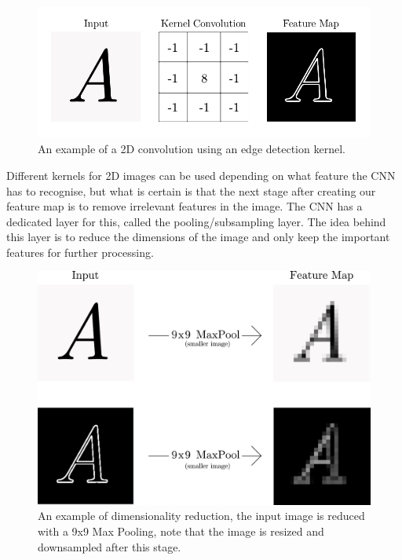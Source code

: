 \documentclass[report, 11pt, oneside]{dissertation}
\begin{document}
\begin{figure}[!htb]
	\centering
	\includegraphics[scale=1]{figure_9.pdf}
	\caption[An example of a 2D convolution.]{An example of a 2D convolution using an edge detection kernel.}
	\label{fig:2d_convolution}
\end{figure}

Different kernels for 2D images can be used depending on what feature the CNN has to recognise, but what is certain is that the next stage after creating our feature map is to remove irrelevant features in the image. The CNN has a dedicated layer for this, called the pooling/subsampling layer. The idea behind this layer is to reduce the dimensions of the image and only keep the important features for further processing. 

\begin{figure}[!htb]
	\centering
	\includegraphics[scale=0.65]{figure_10.pdf}
	\caption[Max pooling.]{An example of dimensionality reduction, the input image is reduced with a 9x9 Max Pooling, note that the image is resized and downsampled after this stage.}
	\label{fig:maxpool}
\end{figure}
\end{document}
